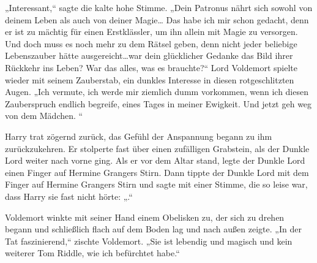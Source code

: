 „Interessant,“ sagte die kalte hohe Stimme. „Dein Patronus nährt sich sowohl von deinem Leben als auch von deiner Magie… Das habe ich mir schon gedacht, denn er ist zu mächtig für einen Erstklässler, um ihn allein mit Magie zu versorgen. Und doch muss es noch mehr zu dem Rätsel geben, denn nicht jeder beliebige Lebenszauber hätte ausgereicht…war dein glücklicher Gedanke das Bild ihrer Rückkehr ins Leben? War das alles, was es brauchte?“
Lord Voldemort spielte wieder mit seinem Zauberstab, ein dunkles Interesse in diesen rotgeschlitzten Augen.
„Ich vermute, ich werde mir ziemlich dumm vorkommen, wenn ich diesen Zauberspruch endlich begreife, eines Tages in meiner Ewigkeit. Und jetzt geh weg von dem Mädchen. “

Harry trat zögernd zurück, das Gefühl der Anspannung begann zu ihm zurückzukehren. Er stolperte fast über einen zufälligen Grabstein, als der Dunkle Lord weiter nach vorne ging.
Als er vor dem Altar stand, legte der Dunkle Lord einen Finger auf Hermine Grangers Stirn.
Dann tippte der Dunkle Lord mit dem Finger auf Hermine Grangers Stirn und sagte mit einer Stimme, die so leise war, dass Harry sie fast nicht hörte: „.“

Voldemort winkte mit seiner Hand einem Obelisken zu, der sich zu drehen begann und schließlich flach auf dem Boden lag und nach außen zeigte.
„In der Tat faszinierend,“ zischte Voldemort. „Sie ist lebendig und magisch und kein weiterer Tom Riddle, wie ich befürchtet habe.“


